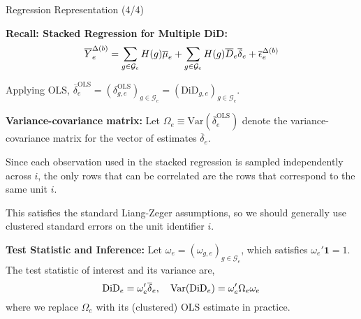 \documentclass[usenames,dvipsnames]{beamer}
\begin{document}
\begin{frame}{Regression Representation (4/4)}


\vspace{-0.05cm}


\textbf{Recall: Stacked Regression for Multiple DiD:}  
\vspace{-0.15cm}
\begin{equation} \notag
\overline{Y}^{\Delta(b)}_{e} 
= 
\sum_{g \in \mathcal{G}_e} H(g) \overline{\mu}_{e} + 
\sum_{g \in \mathcal{G}_e} H(g) \overline{D}_{e} \overline{\delta}_{e} + 
\overline{\epsilon}^{\Delta(b)}_{e}
\end{equation}

\vspace{-0.4cm}

Applying OLS, $\overline{\delta}^{\text{OLS}}_{e} = (\delta^{\text{OLS}}_{g,e} )_{g \in \mathcal{G}_e} = (\text{DiD}_{g,e})_{g \in \mathcal{G}_e}$. 


\vspace{-0.05cm}

\textbf{Variance-covariance matrix:} Let $\Omega_e \equiv \text{Var}(\overline{\delta}^{\text{OLS}}_{e})$ denote the variance-covariance matrix for the vector of estimates $\overline{\delta}_{e}$. 

Since each observation used in the stacked regression is sampled independently across $i$, the only rows that can be correlated are the rows that correspond to the same unit $i$. 

This satisfies the standard Liang-Zeger assumptions, so we should generally use clustered standard errors on the unit identifier $i$.


\vspace{-0.05cm}

\textbf{Test Statistic and Inference:} Let $\omega_e = (\omega_{g,e})_{g \in \mathcal{G}_e}$, which satisfies $\omega_e'\textbf{1} = 1$. The test statistic of interest and its variance are,
\begin{equation} \notag
\text{DiD}_e = \omega_e'\overline{\delta}_{e}, 
\quad
\text{Var}(\text{DiD}_e) =  \omega_e'\Omega_e \omega_e
\end{equation}
where we replace $\Omega_e$ with its (clustered) OLS estimate in practice.



\end{frame}
\end{document}
